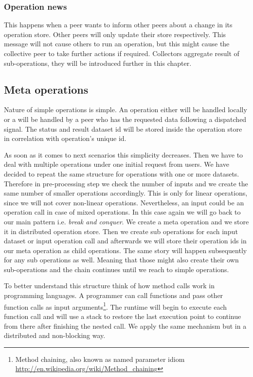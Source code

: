 \subsubsection{Operation news}
This happens when a peer wants to inform other peers about a change in its operation store.
Other peers will only update their store respectively.
This message will not cause others to run an operation, 
but this might cause the collective peer to take further actions if required. 
Collectors aggregate result of sub-operations, they will be introduced further in this chapter.

\subsection{Meta operations}
Nature of simple operations is simple. 
An operation either will be handled locally or a will be handled
by a peer who has the requested data following a dispatched signal. 
The status and result dataset id will be stored inside the operation store in correlation with operation's unique id.

As soon as it comes to next scenarios this simplicity decreases. 
Then we have to deal with multiple operations under one initial request from users.
We have decided to repeat the same structure for operations with one or more datasets.
Therefore in pre-processing step we check the number of inputs and we create the same number of
smaller operations accordingly. 
This is only for linear operations, since we will not cover non-linear operations.
Nevertheless, an input could be an operation call in case of mixed operations.
In this case again we will go back to our main pattern i.e. \textit{break and conquer}. 
We create a meta operation and we store it in distributed operation store. 
Then we create sub operations for each input dataset or input operation call 
and afterwards we will store their operation ids 
in our meta operation as child operations. 
The same story will happen subsequently for any sub operations as well. 
Meaning that those might also create their own sub-operations and the chain continues until we reach to simple operations.

To better understand this structure think of how method calls work in programming languages.
A programmer can call functions and pass other function calls as input 
arguments\footnote{Method chaining, also known as named parameter idiom \url{http://en.wikipedia.org/wiki/Method_chaining}}.
The runtime will begin to execute each function call and will use a stack to restore
the last execution point to continue from there after finishing the nested call.
We apply the same mechanism but in a distributed and non-blocking way.

